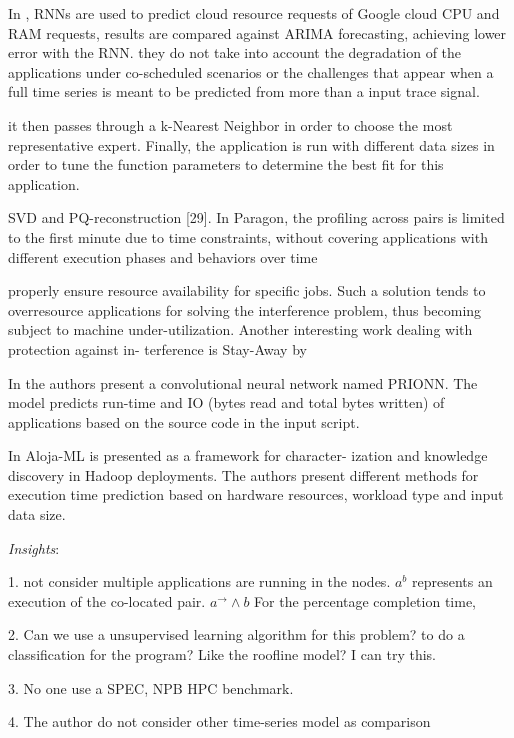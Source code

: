 \documentclass[UTF8]{article}
\begin{document}
In \cite{zhang2016workload}, RNNs are used to predict cloud resource requests of Google cloud CPU and RAM requests, results are compared against ARIMA forecasting, achieving lower error with the RNN. they do not take into account the degradation of the applications under co-scheduled scenarios or the challenges that appear when a full time series is meant to be predicted from more than a input trace signal.

\cite{marco2017improving} it then passes through a k-Nearest Neighbor in order to choose the most representative expert. Finally, the application is run with different data sizes in order to tune the function parameters to determine the best fit for this application. 

SVD and PQ-reconstruction [29]. In Paragon, the profiling across pairs is limited to the first minute due to time constraints, without covering applications with different execution phases and behaviors over time

properly ensure resource availability for specific jobs. Such a solution tends to overresource applications for solving the interference problem, thus becoming subject to machine under-utilization. Another interesting work dealing with protection against in- terference is Stay-Away by \cite{rameshan2014stay}

In \cite{wyatt2018prionn} the authors present a convolutional neural network named PRIONN. The model predicts run-time and IO (bytes read and total bytes written) of applications based on the source code in the input script. 

In \cite{berral2015aloja} Aloja-ML is presented as a framework for character- ization and knowledge discovery in Hadoop deployments. The authors present different methods for execution time prediction based on hardware resources, workload type and input data size.

\emph{Insights}: 

1. not consider multiple applications are running in the nodes. $a^b$ represents an execution of the co-located pair. $a^{\rightarrow} \wedge b$ For the percentage completion time, 

2. Can we use a unsupervised learning algorithm for this problem?  to do a classification for the program?  Like the roofline model? I can try this.

3. No one use a SPEC, NPB HPC benchmark.

4. The author do not consider other time-series model as comparison
\end{document}
